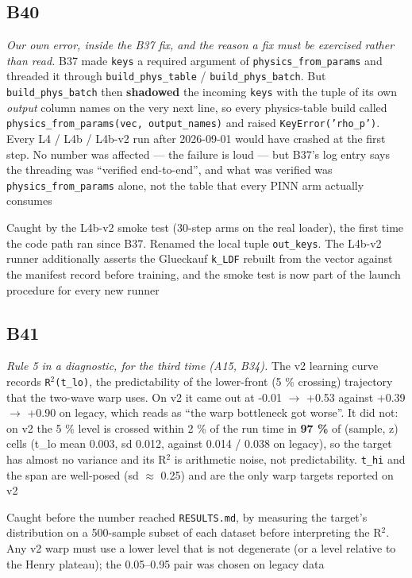 \documentclass[10pt]{article}
\begin{document}
\subsection*{B40}\label{led:B40}
\begin{description}[leftmargin=0pt,itemsep=1pt]
\item[Defect.] \emph{Our own error, inside the B37 fix, and the reason a fix must be exercised rather than read.} B37 made \texttt{keys} a required argument of \texttt{physics\_from\_params} and threaded it through \texttt{build\_phys\_table} / \texttt{build\_phys\_batch}. But \texttt{build\_phys\_batch} then \textbf{shadowed} the incoming \texttt{keys} with the tuple of its own \emph{output} column names on the very next line, so every physics-table build called \texttt{physics\_from\_params(vec, output\_names)} and raised \texttt{KeyError('rho\_p')}. Every L4 / L4b / L4b-v2 run after 2026-09-01 would have crashed at the first step. No number was affected --- the failure is loud --- but B37's log entry says the threading was ``verified end-to-end'', and what was verified was \texttt{physics\_from\_params} alone, not the table that every PINN arm actually consumes
\item[How it was caught.] Caught by the L4b-v2 smoke test (30-step arms on the real loader), the first time the code path ran since B37. Renamed the local tuple \texttt{out\_keys}. The L4b-v2 runner additionally asserts the Glueckauf \texttt{k\_LDF} rebuilt from the vector against the manifest record before training, and the smoke test is now part of the launch procedure for every new runner
\end{description}
\subsection*{B41}\label{led:B41}
\begin{description}[leftmargin=0pt,itemsep=1pt]
\item[Defect.] \emph{Rule 5 in a diagnostic, for the third time (A15, B34).} The v2 learning curve records \texttt{R$^2$(t\_lo)}, the predictability of the lower-front (5 \% crossing) trajectory that the two-wave warp uses. On v2 it came out at -0.01 $\rightarrow$ +0.53 against +0.39 $\rightarrow$ +0.90 on legacy, which reads as ``the warp bottleneck got worse''. It did not: on v2 the 5 \% level is crossed within 2 \% of the run time in \textbf{97 \%} of (sample, z) cells (t\_lo mean 0.003, sd 0.012, against 0.014 / 0.038 on legacy), so the target has almost no variance and its R$^2$ is arithmetic noise, not predictability. \texttt{t\_hi} and the span are well-posed (sd $\approx$ 0.25) and are the only warp targets reported on v2
\item[How it was caught.] Caught before the number reached \texttt{RESULTS.md}, by measuring the target's distribution on a 500-sample subset of each dataset before interpreting the R$^2$. Any v2 warp must use a lower level that is not degenerate (or a level relative to the Henry plateau); the 0.05--0.95 pair was chosen on legacy data
\end{description}
\end{document}
